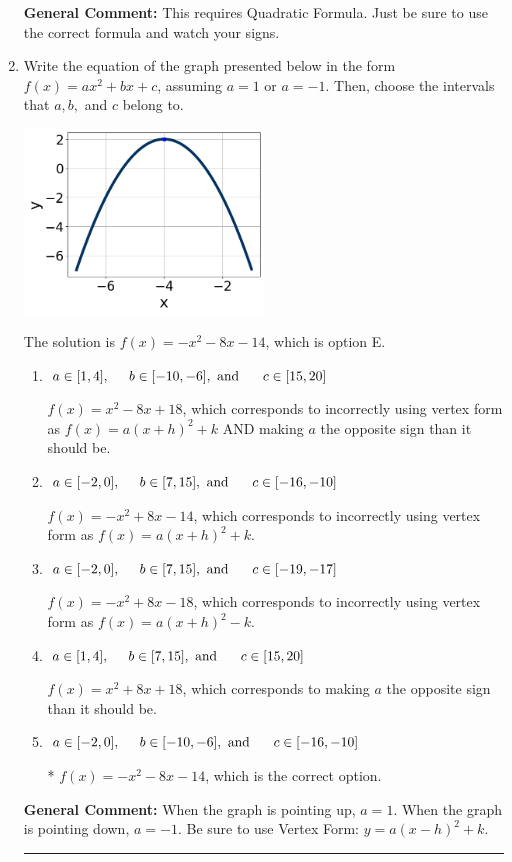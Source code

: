 \documentclass{extbook}[14pt]
\newcommand{\litem}[1]{\item #1

\rule{\textwidth}{0.4pt}}
\begin{document}
\begin{enumerate}
{\textbf{General Comment:} This requires Quadratic Formula. Just be sure to use the correct formula and watch your signs.
}
\litem{
Write the equation of the graph presented below in the form $f(x)=ax^2+bx+c$, assuming  $a=1$ or $a=-1$. Then, choose the intervals that $a, b,$ and $c$ belong to.

\begin{center}
    \includegraphics[width=0.5\textwidth]{../Figures/quadraticGraphToEquationC.png}
\end{center}




The solution is \( f(x) = -x^{2} -8 x -14 \), which is option E.\begin{enumerate}[label=\Alph*.]
\item \( a \in [1, 4], \hspace*{5mm} b \in [-10, -6], \text{ and } \hspace*{5mm} c \in [15, 20] \)

$f(x)=x^{2} -8 x + 18$, which corresponds to incorrectly using vertex form as $f(x) = a(x+h)^2+k$ AND making $a$ the opposite sign than it should be.
\item \( a \in [-2, 0], \hspace*{5mm} b \in [7, 15], \text{ and } \hspace*{5mm} c \in [-16, -10] \)

$f(x)=-x^{2} +8 x -14$, which corresponds to incorrectly using vertex form as $f(x) = a(x+h)^2+k$.
\item \( a \in [-2, 0], \hspace*{5mm} b \in [7, 15], \text{ and } \hspace*{5mm} c \in [-19, -17] \)

$f(x)=-x^{2} +8 x -18$, which corresponds to incorrectly using vertex form as $f(x) = a(x+h)^2 - k$.
\item \( a \in [1, 4], \hspace*{5mm} b \in [7, 15], \text{ and } \hspace*{5mm} c \in [15, 20] \)

$f(x)=x^{2} +8 x + 18$, which corresponds to making $a$ the opposite sign than it should be.
\item \( a \in [-2, 0], \hspace*{5mm} b \in [-10, -6], \text{ and } \hspace*{5mm} c \in [-16, -10] \)

* $f(x)=-x^{2} -8 x -14$, which is the correct option.
\end{enumerate}

\textbf{General Comment:} When the graph is pointing up, $a=1$. When the graph is pointing down, $a=-1$. Be sure to use Vertex Form: $y = a(x-h)^2+k$.
}
\end{enumerate}
\end{document}
